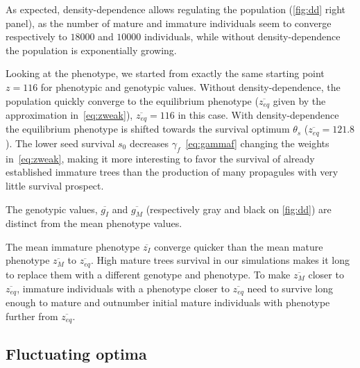 As expected, density-dependence allows regulating the population (\autoref{fig:dd} right panel), as the number of mature and immature individuals seem to converge respectively to $18000$ and $10000$ individuals, while without density-dependence the population is exponentially growing.

Looking at the phenotype, we started from exactly the same starting point $z=116$ for phenotypic and genotypic values. Without density-dependence, the population quickly converge to the equilibrium phenotype ($\overline{z_{eq}}$ given by the approximation in~\autoref{eq:zweak}), $\overline{z_{eq}} = 116$ in this case. With density-dependence the equilibrium phenotype is shifted towards the survival optimum $\theta_s$ ($\overline{z_{eq}} = 121.8$). The lower seed survival $s_0$ decreases $\gamma_f$~\eqref{eq:gammaf} changing the weights in~\eqref{eq:zweak}, making it more interesting to favor the survival of already established immature trees than the production of many propagules with very little survival prospect.

The genotypic values, $\overline{g_I}$ and $\overline{g_M}$ (respectively gray and black on \autoref{fig:dd}) are distinct from the mean phenotype values.

The mean immature phenotype $\overline{z_I}$ converge quicker than the mean mature phenotype $\overline{z_M}$ to $\overline{z_{eq}}$. High mature trees survival in our simulations makes it long to replace them with a different genotype and phenotype. To make $\overline{z_M}$ closer to $\overline{z_{eq}}$, immature individuals with a phenotype closer to $\overline{z_{eq}}$ need to survive long enough to mature and outnumber initial mature individuals with phenotype further from $\overline{z_{eq}}$.

\subsection*{Fluctuating optima}

